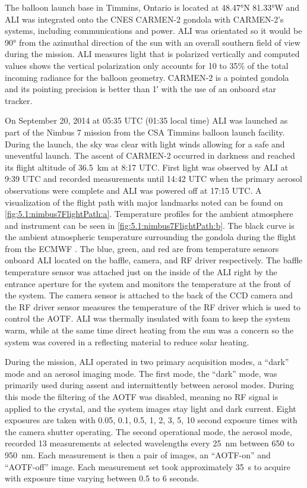 \documentclass[12pt]{article}
\begin{document}
The balloon launch base in Timmins, Ontario is located at 48.47\si{\degree}N 81.33\si{\degree}W and ALI was integrated onto the CNES CARMEN-2 gondola with CARMEN-2's systems, 
including communications and power. ALI was orientated so it would be 90\si{\degree} from the azimuthal direction of the sun with an overall southern field of view during the 
mission. ALI measures light that is polarized vertically and computed values shows the vertical polarization only accounts for 10 to 35\% of the total incoming radiance for the 
balloon geometry. CARMEN-2 is a pointed gondola and its pointing precision is better than 1\si{\arcminute} with the use of an onboard star tracker.

On September 20, 2014 at 05:35 UTC (01:35 local time) ALI was launched as part of the Nimbus 7 mission from the CSA Timmins balloon launch facility. During the launch, the sky 
was clear with light winds allowing for a safe and uneventful launch. The ascent of CARMEN-2 occurred in darkness and reached its flight altitude of 36.5~km at 8:17 UTC. First 
light was observed by ALI at 9:39 UTC and recorded measurements until 14:42 UTC when the primary aerosol observations were complete and ALI was powered off at 17:15 UTC. A 
visualization of the flight path with major landmarks noted can be found on \autoref{fig:5.1:nimbus7FlightPath:a}. Temperature profiles for the ambient atmosphere and instrument 
can be seen in \autoref{fig:5.1:nimbus7FlightPath:b}. The black curve is the ambient atmospheric temperature surrounding the gondola during the flight from the ECMWF 
\citep{Molteni1996}. The blue, green, and red are from temperature sensors onboard ALI located on the baffle, camera, and RF driver respectively. The baffle temperature sensor 
was attached just on the inside of the ALI right by the entrance aperture for the system and monitors the temperature at the front of the system. The camera sensor is attached 
to the back of the CCD camera and the RF driver sensor measures the temperature of the RF driver which is used to control the AOTF. ALI was thermally insulated with foam to keep 
the system warm, while at the same time direct heating from the sun was a concern so the system was covered in a reflecting material to reduce solar heating.

During the mission, ALI operated in two primary acquisition modes, a ``dark'' mode and an aerosol imaging mode. The first mode, the ``dark'' mode, was primarily used during 
assent and intermittently between aerosol modes. During this mode the filtering of the AOTF was disabled, meaning no RF signal is applied to the crystal, and the system images 
stay light and dark current. Eight exposures are taken with 0.05, 0.1, 0.5, 1, 2, 3, 5, 10 second exposure times with the camera shutter operating. The second operational mode, 
the aerosol mode, recorded 13 measurements at selected wavelengths every 25~nm between 650 to 950~nm. Each measurement is then a pair of images, an ``AOTF-on'' and ``AOTF-off'' 
image. Each measurement set took approximately 35~s to acquire with exposure time varying between 0.5 to 6 seconds.
\end{document}

